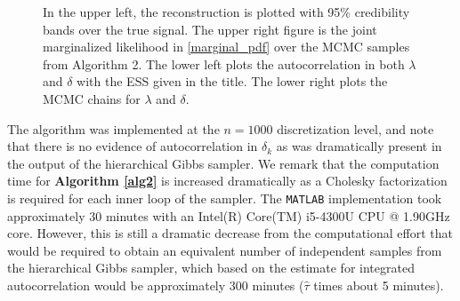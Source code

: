 \documentclass{article}
\renewcommand{\tilde}{\widetilde}
\begin{document}

\begin{figure}[h]

  \caption{In the upper left, the reconstruction is plotted with 95\% credibility bands over the true signal.  
    The upper right figure is the joint marginalized likelihood in \eqref{marginal_pdf} over the MCMC samples from Algorithm 2. 
    The lower left plots the autocorrelation in both $\lambda$ and $\delta$ with the ESS given in the title.  
    The lower right plots the MCMC chains for $\lambda$ and $\delta$.
  }\label{marginalized_recon}
\end{figure}

The algorithm was implemented at the $n=1000$ discretization level, and note that there is no evidence of autocorrelation in $\delta_k$ as was dramatically present in the output of the hierarchical Gibbs sampler. 
We remark that the computation time for \textbf{Algorithm \ref{alg2}} is increased dramatically as a Cholesky factorization is required for each inner loop of the sampler.  
The \texttt{MATLAB} implementation took approximately 30 minutes with an Intel(R) Core(TM) i5-4300U CPU @ 1.90GHz core. 
However, this is still a dramatic decrease from the computational effort that would be required to obtain an equivalent number of independent samples from the hierarchical Gibbs sampler, which based on the estimate for integrated autocorrelation would be approximately 300 minutes ($\hat\tau$ times about 5 minutes).
\end{document}
